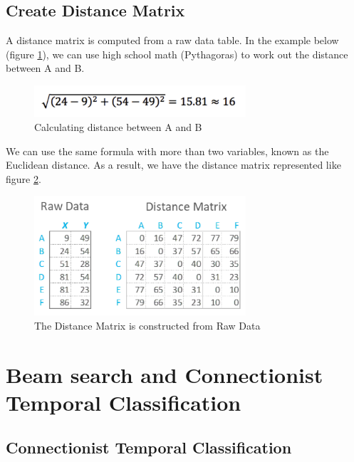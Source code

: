 
\subsection{Create Distance Matrix}

A distance matrix is computed from a raw data table. In the example below (figure \ref{fig:Chap3-DM_Formula}), we can use high school math (Pythagoras) to work out the distance between A and B.

\begin{figure}[H]
	\centering
	\includegraphics[width=0.7\textwidth]{img/Chap3/DM_Formula}
	\caption{ Calculating distance between A and B}
	\label{fig:Chap3-DM_Formula}
\end{figure}

We can use the same formula with more than two variables, known as the Euclidean distance. As a result, we have the distance matrix represented like figure \ref{fig:Chap3-DM-Raw}.

\begin{figure}[H]
	\centering
	\includegraphics[width=0.7\textwidth]{img/Chap3/DM-Raw}
	\caption{ The Distance Matrix is constructed from Raw Data }
	\label{fig:Chap3-DM-Raw}
\end{figure}

\section{Beam search and Connectionist Temporal Classification}
\subsection{Connectionist Temporal Classification}

